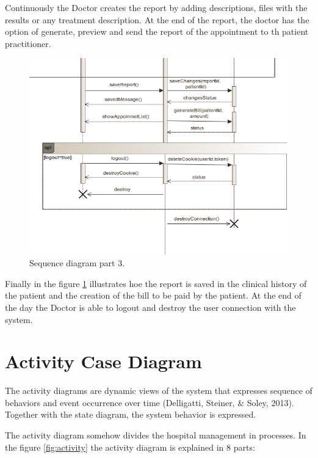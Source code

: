 \documentclass{article}
\begin{document}
{            Continuously the Doctor creates the report by adding descriptions, files with the results or any treatment description. At the end of the report, the doctor has the option of generate, preview and send the report of the appointment to
            th patient practitioner.

            \begin{figure}[H]
                \centering 
                \includegraphics[width=1\linewidth]{./img/seq3.png}
                \caption{Sequence diagram part 3.}
                \label{fig:sequence3}
            \end{figure}

            Finally in the figure \ref{fig:sequence3} illustrates hoe the report is saved in the clinical history of the patient and the creation of the bill to be paid by the patient.
            At the end of the day the Doctor is able to logout and destroy the user connection with the system.

            \section{Activity Case Diagram} %

            The activity diagrams are dynamic views of the system that expresses sequence of
            behaviors and event occurrence over time (Delligatti, Steiner, & Soley, 2013). Together
            with the state diagram, the system behavior is expressed.

            The activity diagram  somehow divides the hospital management in processes. In the figure \ref{fig:activity} the activity diagram is explained in 8 parts:

}
\end{document}

